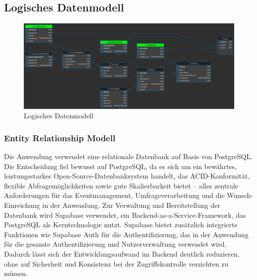 \documentclass[a4paper,12pt]{article}
\begin{document}

\subsection{Logisches Datenmodell}

\begin{figure}[h]
  \centering
  \includegraphics[width=1\textwidth]{Abbildungen/erm.png}
  \caption{Logisches Datenmodell}
  \label{fig:logisches_datenmodell}
\end{figure}


\subsubsection{Entity Relationship Modell}
Die Anwendung verwendet eine relationale Datenbank auf Basis von PostgreSQL. Die Entscheidung fiel bewusst auf PostgreSQL, da es sich um ein bewährtes, leistungsstarkes Open-Source-Datenbanksystem handelt, das ACID-Konformität, flexible Abfragemöglichkeiten sowie gute Skalierbarkeit bietet – alles zentrale Anforderungen für das Eventmanagement, Umfrageverarbeitung und die Wunsch-Einreichung in der Anwendung. Zur Verwaltung und Bereitstellung der Datenbank wird Supabase verwendet, ein Backend-as-a-Service-Framework, das PostgreSQL als Kerntechnologie nutzt. Supabase bietet zusätzlich integrierte Funktionen wie Supabase Auth für die Authentifizierung, das in der Anwendung für die gesamte Authentifizierung und Nutzerverwaltung verwendet wird. Dadurch lässt sich der Entwicklungsaufwand im Backend deutlich reduzieren, ohne auf Sicherheit und Konsistenz bei der Zugriffskontrolle verzichten zu müssen.

\end{document}
